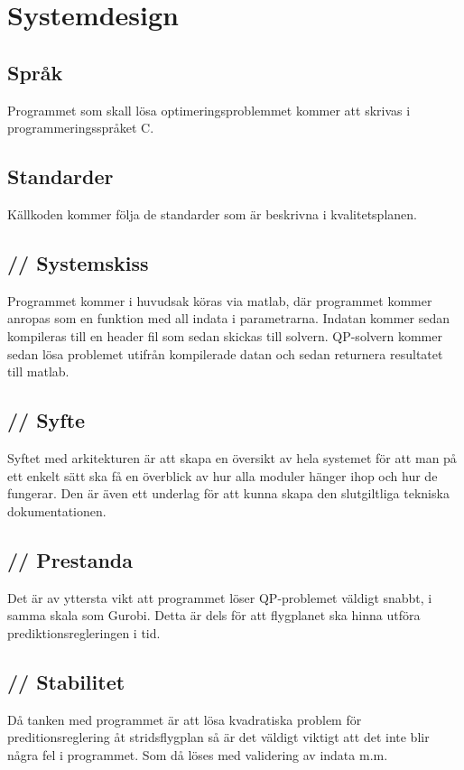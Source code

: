 \section{Systemdesign}


\subsection{Språk}
Programmet som skall lösa optimeringsproblemmet kommer att skrivas i programmeringsspråket C. 

\subsection{Standarder}
Källkoden kommer följa de standarder som är beskrivna i kvalitetsplanen.

\subsection{// Systemskiss}
Programmet kommer i huvudsak köras via matlab, där programmet kommer anropas som en funktion med all indata i parametrarna. Indatan kommer sedan kompileras till en header fil som sedan skickas till solvern. QP-solvern kommer sedan lösa problemet utifrån kompilerade datan och sedan returnera resultatet till matlab.



\subsection{// Syfte}
Syftet med arkitekturen är att skapa en översikt av hela systemet för att man på ett enkelt sätt ska få en överblick av hur alla moduler hänger ihop och hur de fungerar. Den är även ett underlag för att kunna skapa den slutgiltliga tekniska dokumentationen.

\subsection{// Prestanda}
Det är av yttersta vikt att programmet löser QP-problemet väldigt snabbt, i samma skala som Gurobi. Detta är dels för att flygplanet ska hinna utföra prediktionsregleringen i tid.

\subsection{// Stabilitet}
Då tanken med programmet är att lösa kvadratiska problem för preditionsreglering åt stridsflygplan så är det väldigt viktigt att det inte blir några fel i programmet. Som då löses med validering av indata m.m.

